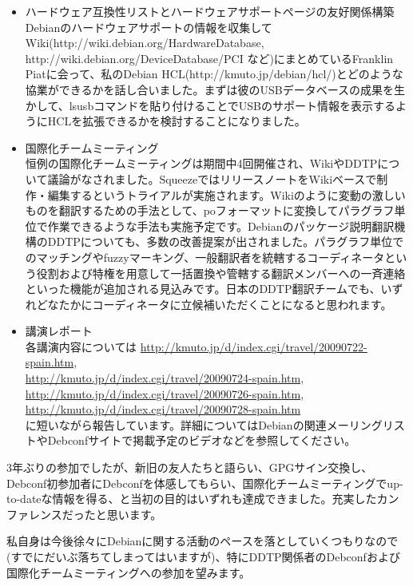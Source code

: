 \documentclass[mingoth,a4paper]{jsarticle}
\begin{document}
\begin{itemize}
\item ハードウェア互換性リストとハードウェアサポートページの友好関係構築\\
  Debianのハードウェアサポートの情報を収集してWiki(http://wiki.debian.org/HardwareDatabase, http://wiki.debian.org/DeviceDatabase/PCI など)にまとめているFranklin Piatに会って、私のDebian HCL(http://kmuto.jp/debian/hcl/)とどのような協業ができるかを話し合いました。まずは彼のUSBデータベースの成果を生かして、lsusbコマンドを貼り付けることでUSBのサポート情報を表示するようにHCLを拡張できるかを検討することになりました。
\item 国際化チームミーティング\\
  恒例の国際化チームミーティングは期間中4回開催され、WikiやDDTPについて議論がなされました。SqueezeではリリースノートをWikiベースで制作・編集するというトライアルが実施されます。Wikiのように変動の激しいものを翻訳するための手法として、poフォーマットに変換してパラグラフ単位で作業できるような手法も実施予定です。Debianのパッケージ説明翻訳機構のDDTPについても、多数の改善提案が出されました。パラグラフ単位でのマッチングやfuzzyマーキング、一般翻訳者を統轄するコーディネータという役割および特権を用意して一括置換や管轄する翻訳メンバーへの一斉連絡といった機能が追加される見込みです。日本のDDTP翻訳チームでも、いずれどなたかにコーディネータに立候補いただくことになると思われます。
\item 講演レポート\\
  各講演内容については
  \url{http://kmuto.jp/d/index.cgi/travel/20090722-spain.htm}, \\
  \url{http://kmuto.jp/d/index.cgi/travel/20090724-spain.htm}, \\
  \url{http://kmuto.jp/d/index.cgi/travel/20090726-spain.htm}, \\
  \url{http://kmuto.jp/d/index.cgi/travel/20090728-spain.htm}  \\
  に短いながら報告しています。詳細についてはDebianの関連メーリングリストやDebconfサイトで掲載予定のビデオなどを参照してください。
\end{itemize}

3年ぶりの参加でしたが、新旧の友人たちと語らい、GPGサイン交換し、Debconf初参加者にDebconfを体感してもらい、国際化チームミーティングでup-to-dateな情報を得る、と当初の目的はいずれも達成できました。充実したカンファレンスだったと思います。

私自身は今後徐々にDebianに関する活動のペースを落としていくつもりなので(すでにだいぶ落ちてしまってはいますが)、特にDDTP関係者のDebconfおよび国際化チームミーティングへの参加を望みます。
\end{document}
